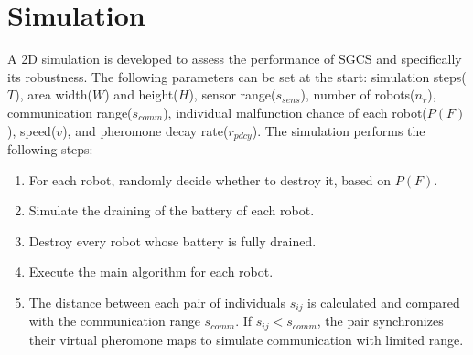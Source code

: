 \section{Simulation}
A 2D simulation is developed to assess the performance of SGCS and specifically its robustness. The following parameters can be set at the start: simulation steps($T$), area width($W$) and height($H$), sensor range($s_{sens}$), number of robots($n_r$), communication range($s_{comm}$), individual malfunction chance of each robot($P(F)$), speed($v$), and pheromone decay rate($r_{pdcy}$). 
The simulation performs the following steps:
\begin{enumerate}
	\item For each robot, randomly decide whether to destroy it, based on $P(F)$. 
	\item Simulate the draining of the battery of each robot.
	\item Destroy every robot whose battery is fully drained.
	\item Execute the main algorithm for each robot.
	\item The distance between each pair of individuals $s_{ij}$ is calculated and compared with the communication range $s_{comm}$. If $s_{ij}<s_{comm}$, the pair synchronizes their virtual pheromone maps to simulate communication with limited range.
\end{enumerate}
